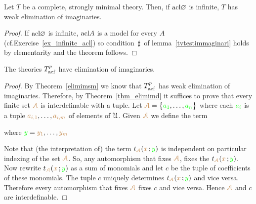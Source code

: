 \begin{theorem}\label{elimimsm} 
Let $T$ be a complete, strongly minimal theory.
Then, if ${\rm acl}\varnothing$ is infinite, $T$ has weak elimination of imaginaries.
\end{theorem}

\begin{proof}
If ${\rm acl}\varnothing$ is infinite, ${\rm acl} A$ is a model for every $A$ (cf.\@ Exercise~\ref{ex_infinite_acl}) so condition $\,\sharp\,$ of lemma~\ref{tvtestimmaginari} holds by elementarity and the theorem follows.
\end{proof}


\begin{theorem}\label{elimimacf} 
The theories $T^p_{\rm acf}$ have elimination of imaginaries.
\end{theorem}

\begin{proof}
By Theorem~\ref{elimimsm} we know that $T^p_{\rm acf}$ has weak elimination of imaginaries.
Therefore, by Theorem~\ref{thm_elimimd} it suffices to prove that every finite set ${\color{brown}\EuScript A}$ is interdefinable with a tuple.
Let ${\color{brown}\EuScript A}=\big\{{\color{green} a_1},\dots,{\color{green} a_n}\big\}$ where each ${\color{green} a_i}$ is a tuple ${\color{brown} a_{i,1}},\dots,{\color{brown} a_{i,m}}$ of elements of $\EuScript U$.
Given ${\color{brown}\EuScript A}$ we define the term

\hfill where ${\color{green} y}={\color{brown} y_1},\dots,{\color{brown} y_m}$


Note that (the interpretation of) the term $t_{\color{brown}\EuScript A}({\color{brown} x}\,;{\color{green} y})$ is independent on particular indexing of the set ${\color{brown}\EuScript A}$.
So, any automorphism that fixes ${\color{brown}\EuScript A}$, fixes the  $t_{\color{brown}\EuScript A}({\color{brown} x}\,;{\color{green} y})$.
Now rewrite $t_{\color{brown}\EuScript A}({\color{brown} x}\,;{\color{green} y})$ as a sum of monomials and let $c$ be the tuple of coefficients of these monomials.
The tuple $c$ uniquely determines $t_{\color{brown}\EuScript A}({\color{brown} x}\,;{\color{green} y})$ and vice versa.
Therefore every automorphism that fixes  ${\color{brown}\EuScript A}$ fixes  $c$ and vice versa.
Hence  ${\color{brown}\EuScript A}$ and  $c$ are interdefinable.
\end{proof}

